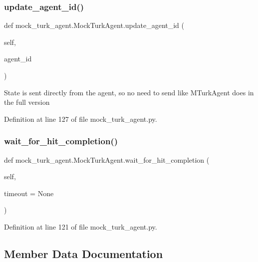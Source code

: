 \subsubsection{\texorpdfstring{update\+\_\+agent\+\_\+id()}{update\_agent\_id()}}
{\footnotesize\ttfamily def mock\+\_\+turk\+\_\+agent.\+Mock\+Turk\+Agent.\+update\+\_\+agent\+\_\+id (\begin{DoxyParamCaption}\item[{}]{self,  }\item[{}]{agent\+\_\+id }\end{DoxyParamCaption})}

\begin{DoxyVerb}State is sent directly from the agent, so no need to send like
MTurkAgent does in the full version
\end{DoxyVerb}
 

Definition at line 127 of file mock\+\_\+turk\+\_\+agent.\+py.

\mbox{\label{classmock__turk__agent_1_1MockTurkAgent_a6d4b090cedb00e74f27abf53c703fba6}} 
\subsubsection{\texorpdfstring{wait\+\_\+for\+\_\+hit\+\_\+completion()}{wait\_for\_hit\_completion()}}
{\footnotesize\ttfamily def mock\+\_\+turk\+\_\+agent.\+Mock\+Turk\+Agent.\+wait\+\_\+for\+\_\+hit\+\_\+completion (\begin{DoxyParamCaption}\item[{}]{self,  }\item[{}]{timeout = {\ttfamily None} }\end{DoxyParamCaption})}



Definition at line 121 of file mock\+\_\+turk\+\_\+agent.\+py.



\subsection{Member Data Documentation}
\mbox{\label{classmock__turk__agent_1_1MockTurkAgent_a7bf5a827ac190c37e605ffa7d69f6a6e}} 
